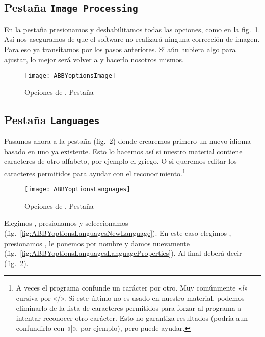 \documentclass[%
	a5paper,
	10pt,
	twoside,
	openright,
	final,
]{memoir}
\begin{document}
	\subsection{Pestaña \texttt{Image Processing}} En la pestaña  presionamos  y deshabilitamos todas las opciones, como en la fig.~\ref{fig:ABBYoptionsImage}. Así nos aseguramos de que el software no realizará ninguna corrección de imagen. Para eso ya transitamos por los pasos anteriores. Si aún hubiera algo para ajustar, lo mejor será volver a \scantailor y hacerlo nosotros mismos.

	\begin{figure}
		\centering
		\texttt{[image: ABBYoptionsImage]}
		\caption[Opciones de \abby. Pestaña Image Processing]{Opciones de \abby. Pestaña \label{fig:ABBYoptionsImage}}
	\end{figure}

	\subsection{Pestaña \texttt{Languages}} Pasamos ahora a la pestaña  (fig.~\ref{fig:ABBYoptionsLanguages}) donde crearemos primero un nuevo idioma basado en uno ya existente. Esto lo hacemos así si nuestro material contiene caracteres de otro alfabeto, por ejemplo el griego. O si queremos editar los caracteres permitidos para ayudar con el reconocimiento.\footnote{A veces el programa confunde un carácter por otro. Muy comúnmente «\textit{l}» cursiva por «/». Si este último no es usado en nuestro material, podemos eliminarlo de la lista de caracteres permitidos para forzar al programa a intentar reconocer otro carácter. Esto no garantiza resultados (podría aun confundirlo con «|», por ejemplo), pero puede ayudar.}

	\begin{figure}
		\centering
		\texttt{[image: ABBYoptionsLanguages]}
		\caption[Opciones de \abby. Pestaña Languages]{Opciones de \abby. Pestaña \label{fig:ABBYoptionsLanguages}}
	\end{figure}

	Elegimos , presionamos  y seleccionamos  (fig.~\ref{fig:ABBYoptionsLanguagesNewLanguage}). En este caso elegimos , presionamos , le ponemos por nombre  y damos  nuevamente (fig.~\ref{fig:ABBYoptionsLanguagesLanguageProperties}). Al final deberá decir  (fig.~\ref{fig:ABBYoptionsLanguages}).
\end{document}
